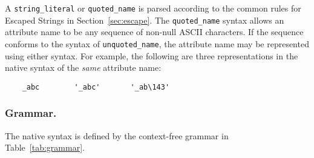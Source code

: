 \documentclass{article}
\begin{document}
A \verb/string_literal/ or \verb/quoted_name/ is parsed according to the
common rules for Escaped Strings in Section~\ref{sec:escape}.
The \verb/quoted_name/ syntax allows an attribute name to be any sequence of
non-null ASCII characters.  If the sequence conforms to the syntax of
\verb/unquoted_name/, the attribute name may be represented using either
syntax.  For example, the following are three representations in the native
syntax of the \emph{same} attribute name:
\begin{verbatim}
    _abc        '_abc'       '_ab\143'
\end{verbatim}

\subsubsection{Grammar.}
The native syntax is defined by the context-free grammar in
Table~\ref{tab:grammar}.
\end{document}
